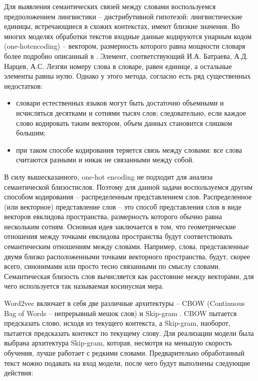 Для выявления семантических связей между словами воспользуемся предположением лингвистики – 
дистрибутивной гипотезой: лингвистические единицы, встречающиеся в схожих контекстах, имеют близкие значения. 
Во многих моделях обработки текстов входные данные кодируются унарным кодом (one-hotencoding) – вектором, размерность которого равна мощности словаря более подробно 
описанный в \cite{neural02}. Элемент, соответствующий И.А. Батраева, А.Д. Нарцев, А.С. Лезгян номеру слова в словаре, равен единице, а остальные элементы равны нулю.
Однако у этого метода, согласно \cite{neural02} есть ряд существенных недостатков:

\begin{itemize}
  \item словари естественных языков могут быть достаточно объемными и исчисляться десятками и сотнями тысяч слов; следовательно, если каждое слово кодировать таким вектором, объем данных становится слишком большим;
  \item при таком способе кодирования теряется связь между словами: все слова считаются разными и никак не связанными между собой.
\end{itemize}

В силу вышесказанного, one-hot encoding не подходит для анализа семантической близостислов. Поэтому для данной задачи воспользуемся другим способом кодирования – распределенным представлением слов.
Распределенное (или векторное) представление слов – это способ представления слов в виде векторов евклидова пространства, размерность которого обычно равна нескольким сотням. Основная идея заключается в том, что геометрические отношения между точками евклидова пространства будут соответствовать семантическим отношениям между словами. Например, слова, представленные двумя близко расположенными точками векторного пространства, будут, скорее всего, синонимами или просто тесно связанными по смыслу словами. Семантическая близость слов вычисляется как расстояние между векторами, для чего используется так называемая косинусная мера.

Word2vec включает в себя две различные архитектуры – CBOW (Continuous Bag of Words – непрерывный мешок слов) и Skip-gram \cite{seman01}. CBOW пытается предсказать слово, исходя из текущего контекста, а Skip-gram, наоборот, пытается предсказать контекст по текущему слову. Для реализации модели была выбрана архитектура Skip-gram, которая, несмотря на меньшую скорость обучения, лучше работает с редкими словами.
Предварительно обработанный текст можно подавать на вход модели, после чего будут выполнены следующие действия:

